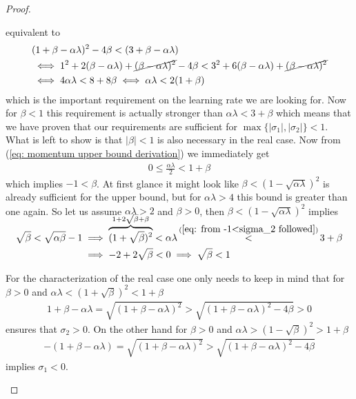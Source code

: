 \begin{proof}
\begin{description}[wide, labelindent=0pt]
		equivalent to 
		\begin{align}
			\nonumber
			&(1+\beta-\alpha\lambda)^2 - 4\beta < (3+\beta-\alpha\lambda)\\
			\nonumber
			&\iff 1^2 + 2(\beta-\alpha\lambda) + \cancel{(\beta-\alpha\lambda)^2} - 4\beta
			< 3^2 + 6(\beta-\alpha\lambda) + \cancel{(\beta-\alpha\lambda)^2}\\
			\label{eq: momentum upper bound derivation}
			&\iff 4\alpha\lambda < 8 + 8\beta
			\iff \alpha\lambda < 2(1+\beta)
		\end{align}
		which is the important requirement on the learning rate we are looking for.
		Now for \(\beta<1\) this requirement is actually stronger than
		\(\alpha\lambda <3+\beta\) which means that we have proven that our
		requirements are sufficient for \(\max\{|\sigma_1|,|\sigma_2|\}<1\).
		What is left to show is that \(|\beta|<1\) is also necessary in the real
		case. Now from (\ref{eq: momentum upper bound derivation}) we immediately
		get
		\begin{align*}
			0 \le \tfrac{\alpha\lambda}2 < 1+\beta
		\end{align*}
		which implies \(-1 < \beta\). At first glance it might look like
		\(\beta<(1-\sqrt{\alpha\lambda})^2\) is already sufficient for the upper
		bound, but for \(\alpha\lambda>4\) this bound is greater than one again.
		So let us assume \(\alpha\lambda>2\) and \(\beta>0\), then
		\(\beta<(1-\sqrt{\alpha\lambda})^2\) implies
		\begin{align*}
			\sqrt{\beta} < \sqrt{\alpha\beta} -1
			&\implies \smash{\overbrace{(1+\sqrt{\beta})^2}^{1+2\sqrt{\beta} + \beta}}
			< \alpha\lambda
			\stackrel{(\ref{eq: from -1<sigma_2 followed})}{<} 3+\beta \\
			&\implies -2 +2\sqrt{\beta} < 0
			\implies \sqrt{\beta} < 1
		\end{align*}

		For the characterization of the real case one only needs to keep in mind that for
		\(\beta>0\) and \(\alpha\lambda < (1+\sqrt{\beta})^2 <1+\beta\)
		\begin{align*}
			1+\beta-\alpha\lambda = \sqrt{(1+\beta-\alpha\lambda)^2}
			> \sqrt{(1+\beta-\alpha\lambda)^2 - 4\beta} > 0
		\end{align*}
		ensures that \(\sigma_2 >0\). On the other hand for \(\beta>0\)
		and \(\alpha\lambda > (1-\sqrt{\beta})^2> 1+\beta\)
		\begin{align*}
			- (1+\beta-\alpha\lambda) = \sqrt{(1+\beta-\alpha\lambda)^2}
			> \sqrt{(1+\beta-\alpha\lambda)^2 - 4\beta}
		\end{align*}
		implies \(\sigma_1 < 0\). \qedhere
 \end{description}
\end{proof}

